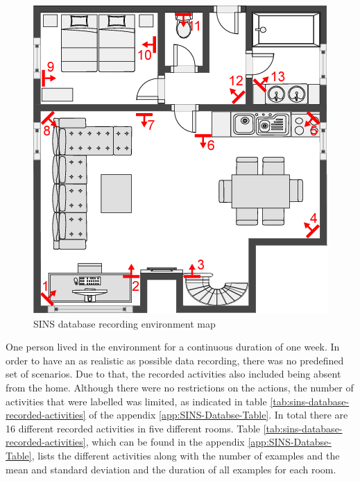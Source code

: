 \begin{figure}[htbp]
	\centering
	\includegraphics[scale=0.5]{baa-documentation/img/SINS_database_floor_map.png}
	\caption[SINS database recording environment map]{SINS database recording environment map \footnotemark}
	\label{fig:sins-database-floor-map}
\end{figure}
\noindent
One person lived in the environment for a continuous duration of one week. In order to have an as realistic as possible data recording, there was no predefined set of scenarios. Due to that, the recorded activities also included being absent from the home. Although there were no restrictions on the actions, the number of activities that were labelled was limited, as indicated in table \ref{tab:sins-database-recorded-activities} of the appendix \ref{app:SINS-Databse-Table}. In total there are 16 different recorded activities in five different rooms. Table \ref{tab:sins-database-recorded-activities}, which can be found in the appendix \ref{app:SINS-Databse-Table}, lists the different activities along with the number of examples and the mean and standard deviation and the duration of all examples for each room.

